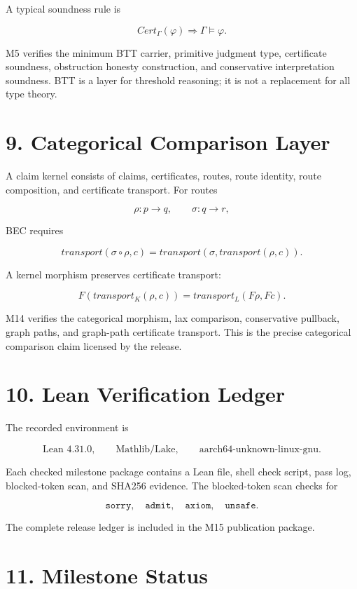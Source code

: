 \documentclass[
  11pt,
]{article}
\begin{document}
A typical soundness rule is

\[
Cert_\Gamma(\varphi)\Rightarrow \Gamma\models\varphi.
\]

M5 verifies the minimum BTT carrier, primitive judgment type,
certificate soundness, obstruction honesty construction, and
conservative interpretation soundness. BTT is a layer for threshold
reasoning; it is not a replacement for all type theory.

\section{9. Categorical Comparison
Layer}\label{categorical-comparison-layer}

A claim kernel consists of claims, certificates, routes, route identity,
route composition, and certificate transport. For routes

\[
\rho:p\to q,
\qquad
\sigma:q\to r,
\]

BEC requires

\[
transport(\sigma\circ\rho,c)=transport(\sigma,transport(\rho,c)).
\]

A kernel morphism preserves certificate transport:

\[
F(transport_K(\rho,c))=transport_L(F\rho,Fc).
\]

M14 verifies the categorical morphism, lax comparison, conservative
pullback, graph paths, and graph-path certificate transport. This is the
precise categorical comparison claim licensed by the release.

\section{10. Lean Verification Ledger}\label{lean-verification-ledger}

The recorded environment is

\[
\text{Lean }4.31.0,\qquad \text{Mathlib/Lake},\qquad \text{aarch64-unknown-linux-gnu}.
\]

Each checked milestone package contains a Lean file, shell check script,
pass log, blocked-token scan, and SHA256 evidence. The blocked-token
scan checks for

\[
\texttt{sorry},\quad \texttt{admit},\quad \texttt{axiom},\quad \texttt{unsafe}.
\]

The complete release ledger is included in the M15 publication package.

\section{11. Milestone Status}\label{milestone-status}
\end{document}
